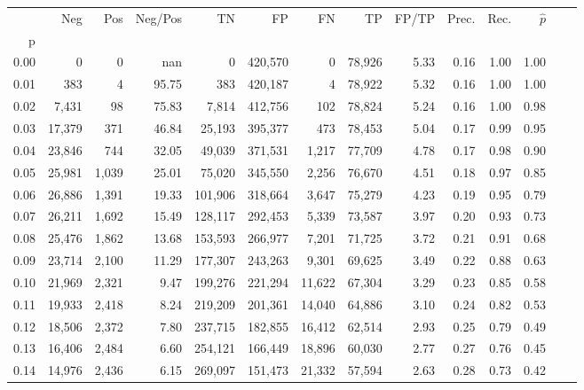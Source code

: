 \begin{tabular}{rrrrrrrrrrrrrr}
\toprule
{} &     Neg &    Pos & Neg/Pos &       TN &       FP &      FN &      TP & FP/TP & Prec. &  Rec. & $\hat{p}$ \\
p    &         &        &         &          &          &         &         &       &       &       &           \\
\midrule
0.00 &       0 &      0 &     nan &        0 &  420,570 &       0 &  78,926 &  5.33 &  0.16 &  1.00 &      1.00 \\
0.01 &     383 &      4 &   95.75 &      383 &  420,187 &       4 &  78,922 &  5.32 &  0.16 &  1.00 &      1.00 \\
0.02 &   7,431 &     98 &   75.83 &    7,814 &  412,756 &     102 &  78,824 &  5.24 &  0.16 &  1.00 &      0.98 \\
0.03 &  17,379 &    371 &   46.84 &   25,193 &  395,377 &     473 &  78,453 &  5.04 &  0.17 &  0.99 &      0.95 \\
0.04 &  23,846 &    744 &   32.05 &   49,039 &  371,531 &   1,217 &  77,709 &  4.78 &  0.17 &  0.98 &      0.90 \\
0.05 &  25,981 &  1,039 &   25.01 &   75,020 &  345,550 &   2,256 &  76,670 &  4.51 &  0.18 &  0.97 &      0.85 \\
0.06 &  26,886 &  1,391 &   19.33 &  101,906 &  318,664 &   3,647 &  75,279 &  4.23 &  0.19 &  0.95 &      0.79 \\
0.07 &  26,211 &  1,692 &   15.49 &  128,117 &  292,453 &   5,339 &  73,587 &  3.97 &  0.20 &  0.93 &      0.73 \\
0.08 &  25,476 &  1,862 &   13.68 &  153,593 &  266,977 &   7,201 &  71,725 &  3.72 &  0.21 &  0.91 &      0.68 \\
0.09 &  23,714 &  2,100 &   11.29 &  177,307 &  243,263 &   9,301 &  69,625 &  3.49 &  0.22 &  0.88 &      0.63 \\
0.10 &  21,969 &  2,321 &    9.47 &  199,276 &  221,294 &  11,622 &  67,304 &  3.29 &  0.23 &  0.85 &      0.58 \\
0.11 &  19,933 &  2,418 &    8.24 &  219,209 &  201,361 &  14,040 &  64,886 &  3.10 &  0.24 &  0.82 &      0.53 \\
0.12 &  18,506 &  2,372 &    7.80 &  237,715 &  182,855 &  16,412 &  62,514 &  2.93 &  0.25 &  0.79 &      0.49 \\
0.13 &  16,406 &  2,484 &    6.60 &  254,121 &  166,449 &  18,896 &  60,030 &  2.77 &  0.27 &  0.76 &      0.45 \\
0.14 &  14,976 &  2,436 &    6.15 &  269,097 &  151,473 &  21,332 &  57,594 &  2.63 &  0.28 &  0.73 &      0.42 \\

\end{tabular}
